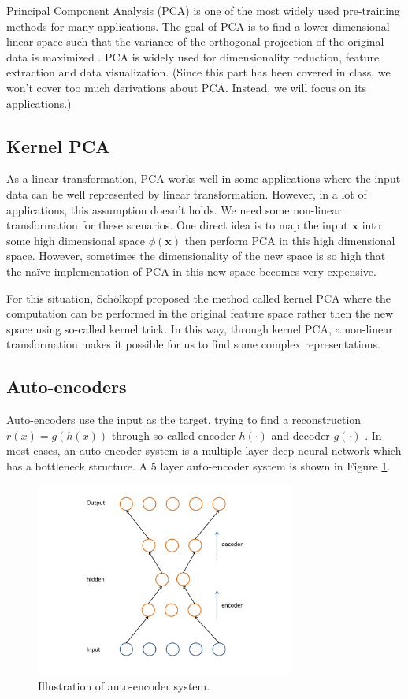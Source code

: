 \documentclass{article}
\begin{document}
Principal Component Analysis (PCA) is one of the most widely used pre-training methods for many applications. The goal of PCA is to find a lower dimensional linear space such that the variance of the orthogonal projection of the original data is maximized \cite{bishop2007pattern}. PCA is widely used for dimensionality reduction, feature extraction and data visualization. (Since this part has been covered in class, we won't cover too much derivations about PCA. Instead, we will focus on its applications.)

\subsection{Kernel PCA}

As a linear transformation, PCA works well in some applications where the input data can be well represented by linear transformation. However, in a lot of applications, this assumption doesn't holds. We need some non-linear transformation for these scenarios. One direct idea is to map the input $\pmb{x}$ into some high dimensional space $\phi(\pmb{x})$ then perform PCA in this high dimensional space. However, sometimes the dimensionality of the new space is so high that the na\"{i}ve implementation of PCA in this new space becomes very expensive. 

For this situation, Sch\"{o}lkopf \cite{scholkopf1998nonlinear, friedman2001elements} proposed the method called kernel PCA where the computation can be performed in the original feature space rather then the new space using so-called kernel trick. In this way, through kernel PCA, a non-linear transformation makes it possible for us to find some complex representations. 

\subsection{Auto-encoders}

Auto-encoders use the input as the target, trying to find a reconstruction $r(x) = g(h(x))$ through so-called encoder $h(\cdot)$ and decoder $g(\cdot)$ \cite{bengio2012deep}. In most cases, an auto-encoder system is a multiple layer deep neural network which has a bottleneck structure. A 5 layer auto-encoder system is shown in Figure \ref{fig:autoencoder}.

\begin{figure}[htb]
\centering
\includegraphics[width=8.5cm]{./figures/autoencoder.pdf}
\caption{Illustration of auto-encoder system.}
\label{fig:autoencoder}
\end{figure}
\end{document}
